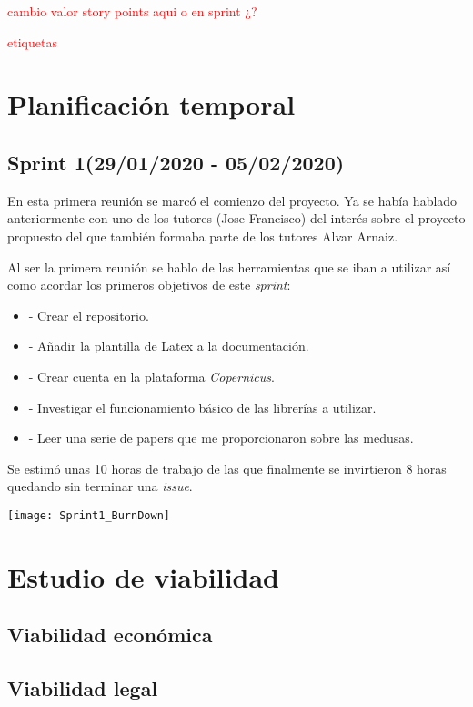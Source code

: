 \textcolor{red}{cambio valor story points aqui o en sprint ¿?}
 
\textcolor{red}{etiquetas}

\section{Planificación temporal}

\subsection{Sprint 1(29/01/2020 - 05/02/2020)}\label{Sprint-1}
En esta primera reunión se marcó el comienzo del proyecto. Ya se había hablado anteriormente con uno de los tutores (Jose Francisco) del interés sobre el proyecto propuesto del que también formaba parte de los tutores Alvar Arnaiz.

Al ser la primera reunión se hablo de las herramientas que se iban a utilizar así como acordar los primeros objetivos de este \emph{sprint}:

\begin{itemize}
\item - Crear el repositorio.
\item - Añadir la plantilla de Latex a la documentación.
\item - Crear cuenta en la plataforma \emph{Copernicus}.
\item - Investigar el funcionamiento básico de las librerías a utilizar.
\item - Leer una serie de papers que me proporcionaron sobre las medusas.
\end{itemize}

Se estimó unas 10 horas de trabajo de las que finalmente se invirtieron 8 horas quedando sin terminar una \emph{issue}.

\begin{center}
\texttt{[image: Sprint1\_BurnDown]}
\end{center}

\section{Estudio de viabilidad}

\subsection{Viabilidad económica}

\subsection{Viabilidad legal}


